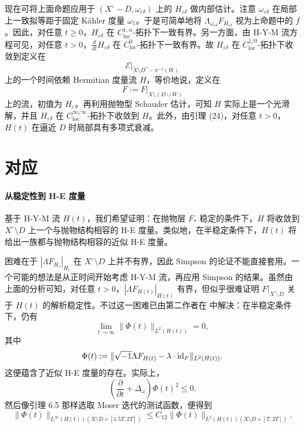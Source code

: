 现在可将上面命题应用于 \((X^\circ-D,\omega_{\varepsilon\delta})\) 上的 \(H_{\varepsilon\delta}\) 做内部估计。注意 \(\omega_{\varepsilon\delta}\) 在局部上一致拟等距于固定 Kähler 度量 \(\omega_1\)。于是可简单地将 \(\Lambda_{\omega_{\varepsilon\delta}}F_{H_{\varepsilon\delta}}\) 视为上命题中的 \(f\)。因此，对任意 \(t\ge 0\)，\(H_{\varepsilon\delta}\) 在 \(C_{\mathrm{loc}}^{1,\alpha}\)-拓扑下一致有界。另一方面，由 H-Y-M 流方程可见，对任意 \(t>0\)，\(\frac{d}{dt}H_{\varepsilon\delta}\) 在 \(C^0_{\mathrm{loc}}\)-拓扑下一致有界。故 \(H_{\varepsilon\delta}\) 在 \(C^{1/0}_{\mathrm{loc}}\)-拓扑下收敛到定义在
\[
\mathcal E|_{\widetilde X\setminus D^*-\pi^{-1}(W)}
\]
上的一个时间依赖 Hermitian 度量流 \(H\)，等价地说，定义在
\[
F:=F|_{X\setminus(D\cup W)}
\]
上的流，初值为 \(H_{\varepsilon}\)。再利用抛物型 Schauder 估计，可知 \(H\) 实际上是一个光滑解，并且 \(H_{\varepsilon\delta}\) 在 \(C_{\mathrm{loc}}^{\infty/\infty}\)-拓扑下收敛到 \(H\)。此外，由引理 (24)，对任意 \(t>0\)，\(H(t)\) 在逼近 \(D\) 时局部具有多项式衰减。

\section{对应}

\paragraph{从稳定性到 H-E 度量}
基于 H-Y-M 流 \(H(t)\)，我们希望证明：在抛物层 \(F_*\) 稳定的条件下，\(H\) 将收敛到 \(X^\circ\setminus D\) 上一个与抛物结构相容的 H-E 度量。类似地，在半稳定条件下，\(H(t)\) 将给出一族都与抛物结构相容的近似 H-E 度量。

困难在于 \(|\Lambda F_{H_{\varepsilon}}|_{H_{\varepsilon}}\) 在 \(X^\circ\setminus D\) 上并不有界，因此 Simpson \cite{Si1} 的论证不能直接套用。一个可能的想法是从正时间开始考虑 H-Y-M 流，再应用 Simpson 的结果。虽然由上面的分析可知，对任意 \(t>0\)，\(|\Lambda F_{H(t)}|_{H(t)}\) 有界，但似乎很难证明 \(F|_{X^\circ\setminus D}\) 关于 \(H(t)\) 的解析稳定性。不过这一困难已由第二作者在 \cite[Proposition 4.1]{Li-Zh-Zh} 中解决：在半稳定条件下，仍有
\[
\lim_{t\to\infty}\|\Phi(t)\|_{L^2(H(t))}=0,
\]
其中
\[
\Phi(t):=\|\sqrt{-1}\Lambda F_{H(t)}-\lambda\cdot \mathrm{id}_F\|_{L^2(H(t))}.
\]
这便蕴含了近似 H-E 度量的存在。实际上，
\[
\left(\frac{\partial}{\partial t}+\Delta_\omega\right)\Phi(t)^2\le 0.
\]
然后像引理 6.5 那样选取 Moser 迭代的测试函数，便得到
\[
\|\Phi(t)\|_{L^\infty(H(t))(X\setminus D\times [1.5T,2T])}
\le
C_{12}\|\Phi(t)\|_{L^2(H(t))(X\setminus D\times [T,2T])}.
\]

